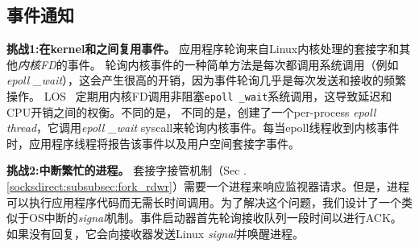 
%

\subsection{事件通知}
\label{socksdirect:subsec:process-mux}

\textbf {挑战1:在kernel和\libipc {}之间复用事件。}
应用程序轮询来自Linux内核处理的套接字和其他\textit {内核FD}的事件。
轮询内核事件的一种简单方法是每次都调用系统调用（例如\textit {epoll \_wait}），这会产生很高的开销，因为事件轮询几乎是每次发送和接收的频繁操作。
LOS~ \cite {huang2017high}定期用内核FD调用非阻塞\texttt {epoll \_wait}系统调用，这导致延迟和CPU开销之间的权衡。不同的是，
不同的是，\libipc {}创建了一个per-process \textit {epoll thread}，它调用\textit {epoll \_wait} syscall来轮询内核事件。每当epoll线程收到内核事件时，应用程序线程将报告该事件以及用户空间套接字事件。

\textbf {挑战2:中断繁忙的进程。}
套接字接管机制（Sec .~ \ref {socksdirect:subsubsec:fork_rdwr}）需要一个进程来响应监视器请求。但是，进程可以执行应用程序代码而无需长时间调用\libipc {}。为了解决这个问题，我们设计了一个类似于OS中断的\textit {signal}机制。事件启动器首先轮询接收队列一段时间以进行ACK。如果没有回复，它会向接收器发送Linux \textit {signal}并唤醒进程。

